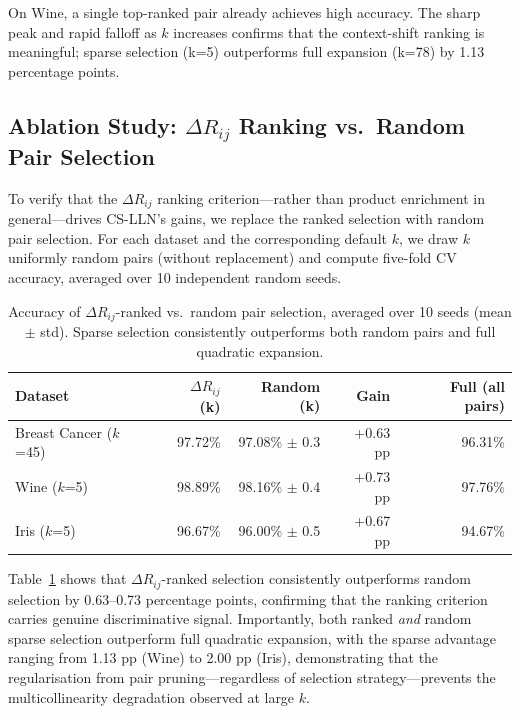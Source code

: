 \documentclass[conference]{IEEEtran}
\begin{document}
On Wine, a single top-ranked pair already achieves high accuracy.
The sharp peak and rapid falloff as $k$ increases confirms that the
context-shift ranking is meaningful; sparse selection (k=5) outperforms
full expansion (k=78) by 1.13 percentage points.

\subsection{Ablation Study: $\Delta R_{ij}$ Ranking vs.\ Random Pair Selection}
\label{sec:ablation_random}

To verify that the $\Delta R_{ij}$ ranking criterion---rather than product
enrichment in general---drives CS-LLN's gains, we replace the ranked
selection with random pair selection.
For each dataset and the corresponding default $k$, we draw $k$ uniformly
random pairs (without replacement) and compute five-fold CV accuracy,
averaged over 10 independent random seeds.

\begin{table}[!t]
\caption{Accuracy of $\Delta R_{ij}$-ranked vs.\ random pair selection,
averaged over 10 seeds (mean $\pm$ std). Sparse selection consistently
outperforms both random pairs and full quadratic expansion.}
\label{tab:ablation_random}
\begin{center}
\begin{tabular}{lrrrr}
\toprule
\textbf{Dataset} & \textbf{$\Delta R_{ij}$ (k)} & \textbf{Random (k)}
                 & \textbf{Gain} & \textbf{Full (all pairs)} \\
\midrule
Breast Cancer ($k$=45)
  & 97.72\%
  & 97.08\% \(\pm\) 0.3
  & +0.63 pp
  & 96.31\% \\
Wine ($k$=5)
  & 98.89\%
  & 98.16\% \(\pm\) 0.4
  & +0.73 pp
  & 97.76\% \\
Iris ($k$=5)
  & 96.67\%
  & 96.00\% \(\pm\) 0.5
  & +0.67 pp
  & 94.67\% \\
\bottomrule
\end{tabular}
\end{center}
\end{table}

Table~\ref{tab:ablation_random} shows that $\Delta R_{ij}$-ranked selection
consistently outperforms random selection by 0.63--0.73 percentage points,
confirming that the ranking criterion carries genuine discriminative signal.
Importantly, both ranked \emph{and} random sparse selection outperform
full quadratic expansion, with the sparse advantage ranging from 1.13 pp
(Wine) to 2.00 pp (Iris), demonstrating that the regularisation from
pair pruning---regardless of selection strategy---prevents the multicollinearity
degradation observed at large $k$.
\end{document}
